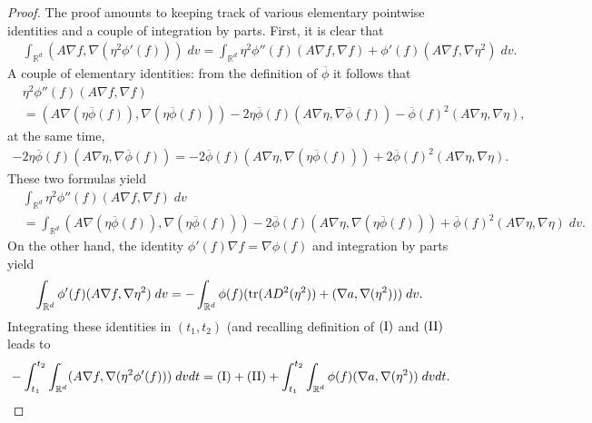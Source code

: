 \documentclass[12pt,american]{amsart}
\numberwithin{equation}{section}
\theoremstyle{plain}
\theoremstyle{definition}                  %
\def\tr{\textnormal{tr}}
\begin{document}
  \begin{proof}
    The proof amounts to keeping track of various elementary pointwise identities and a couple of integration by parts. First, it is clear that
    \begin{align*}
      & \int_{\mathbb{R}^d}(A\nabla f,\nabla (\eta^2 \phi'(f)))\;dv = \int_{\mathbb{R}^d}\eta^2 \phi''(f)(A\nabla f,\nabla f)+\phi'(f)(A\nabla f,\nabla \eta^2)\;dv. 		  
    \end{align*}
    A couple of elementary identities: from the definition of $\overline{\phi}$ it follows that
    \begin{align*}
      & \eta^2 \phi''(f)(A\nabla f,\nabla f) \\ %
      & = (A\nabla (\eta \overline{\phi}(f)),\nabla (\eta \overline{\phi}(f))) -2\eta \overline{\phi}(f)(A\nabla \eta,\nabla \overline{\phi}(f))-\overline{\phi}(f)^2(A\nabla \eta,\nabla \eta),
    \end{align*}	  
    at the same time,
    \begin{align*}
      -2\eta \overline{\phi}(f)(A\nabla \eta,\nabla \overline{\phi}(f)) = -2 \overline{\phi}(f)(A\nabla \eta,\nabla (\eta \overline{\phi}(f)) )+2\overline{\phi}(f)^2(A\nabla \eta,\nabla \eta).
    \end{align*}
    These two formulas yield
    \begin{align*}
      & \int_{\mathbb{R}^d}\eta^2 \phi''(f)(A\nabla f,\nabla f) \;dv\\
      & = \int_{\mathbb{R}^d} (A\nabla (\eta \overline{\phi}(f)),\nabla (\eta \overline{\phi}(f))) -2 \overline{\phi}(f)(A\nabla \eta,\nabla (\eta \overline{\phi}(f)))+\overline{\phi}(f)^2(A\nabla \eta,\nabla \eta) \;dv.		  
    \end{align*}
    On the other hand, the identity $\phi'(f)\nabla f = \nabla \phi(f)$ and integration by parts yield
    \begin{align*}
     \int_{\mathbb{R}^d}\phi'(f)(A\nabla f,\nabla \eta^2)\;dv & = -\int_{\mathbb{R}^d}\phi(f)(\tr(AD^2(\eta^2))+(\nabla a,\nabla (\eta^2)))\;dv.
    \end{align*}
    Integrating these identities in $(t_1,t_2)$ (and recalling definition of $\textnormal{(I)}$ and $\textnormal{(II)}$ leads to	
    \begin{align}\label{eqn:energy identity first half}
      & -\int_{t_1}^{t_2}\int_{\mathbb{R}^d}(A\nabla f,\nabla (\eta^2 \phi'(f)))\;dvdt = \textnormal{(I)}+\textnormal{(II)}+\int_{t_1}^{t_2}\int_{\mathbb{R}^d}\phi(f)(\nabla a,\nabla (\eta^2))\;dvdt.	  

\end{align}
\end{proof}
\end{document}
